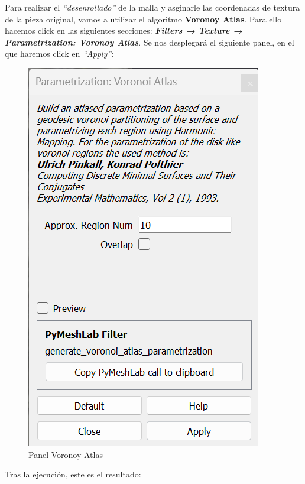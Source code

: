 \documentclass[options]{article}
\begin{document}
Para realizar el \textit{``desenrollado''} de la malla y asginarle las coordenadas de textura de la pieza original, vamos a utilizar el algoritmo \textbf{Voronoy Atlas}. Para ello hacemos click en las siguientes secciones: \textbf{\textit{Filters → Texture → Parametrization: Voronoy Atlas}}. Se nos desplegará el siguiente panel, en el que haremos click en \textit{``Apply''}:

\begin{figure}[H]
    \centering
    \includegraphics[scale=0.34]{images/parametrizacion_01.png}
    \caption{Panel Voronoy Atlas}
\end{figure}

Tras la ejecución, este es el resultado:
\end{document}
